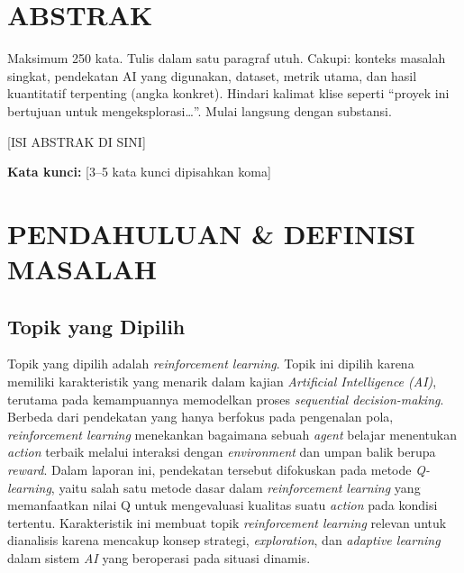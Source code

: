 \documentclass[11pt,a4paper,oneside]{report}
\begin{document}
\chapter*{ABSTRAK}

\begin{petunjuk}
Maksimum 250 kata. Tulis dalam satu paragraf utuh. Cakupi: konteks masalah singkat, pendekatan AI yang digunakan, dataset, metrik utama, dan hasil kuantitatif terpenting (angka konkret). Hindari kalimat klise seperti ``proyek ini bertujuan untuk mengeksplorasi\ldots''. Mulai langsung dengan substansi.
\end{petunjuk}

[ISI ABSTRAK DI SINI]

\vspace{1em}
\noindent\textbf{Kata kunci:} [3--5 kata kunci dipisahkan koma]

\chapter{PENDAHULUAN \& DEFINISI MASALAH}
\label{bab:pendahuluan}

\section{Topik yang Dipilih}

Topik yang dipilih adalah \textit{reinforcement learning}. Topik ini dipilih karena memiliki karakteristik yang menarik dalam kajian \textit{Artificial Intelligence (AI)}, terutama pada kemampuannya memodelkan proses \textit{sequential decision-making}. Berbeda dari pendekatan yang hanya berfokus pada pengenalan pola, \textit{reinforcement learning} menekankan bagaimana sebuah \textit{agent} belajar menentukan \textit{action} terbaik melalui interaksi dengan \textit{environment} dan umpan balik berupa \textit{reward}. Dalam laporan ini, pendekatan tersebut difokuskan pada metode \textit{Q-learning}, yaitu salah satu metode dasar dalam \textit{reinforcement learning} yang memanfaatkan nilai Q untuk mengevaluasi kualitas suatu \textit{action} pada kondisi tertentu. Karakteristik ini membuat topik \textit{reinforcement learning} relevan untuk dianalisis karena mencakup konsep strategi, \textit{exploration}, dan \textit{adaptive learning} dalam sistem \textit{AI} yang beroperasi pada situasi dinamis.
\end{document}

